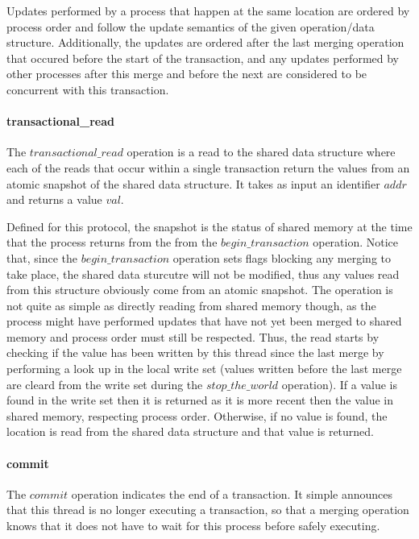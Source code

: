 \documentclass[11pt,letterpaper]{article}
\begin{document}
Updates performed by a process that happen at the same location are ordered by process order and
follow the update semantics of the given operation/data structure.
Additionally, the updates are ordered after the last merging operation that occured before
the start of the transaction, and any updates performed by other processes after this merge and before
the next are considered to be concurrent with this transaction.


\paragraph{transactional\_read}
The $\mathit{transactional\_read}$ operation is a read to the shared data structure
where each of the reads that occur within a single transaction return the values from
an atomic snapshot of the shared data structure.
It takes as input an identifier $\mathit{addr}$ and returns a value $\mathit{val}$.

Defined for this protocol, the snapshot is the status of shared memory at the time that
the process returns from the from the $\mathit{begin\_transaction}$ operation.
Notice that, since the $\mathit{begin\_transaction}$ operation
sets flags blocking any merging to take place, the shared data sturcutre
will not be modified, thus any values read from this structure obviously come from
an atomic snapshot.
The operation is not quite as simple as directly reading from shared memory though,
as the process might have performed updates that have not yet been merged to shared memory
and process order must still be respected.
Thus, the read starts by checking if the value has been written by this
thread since the last merge by performing a look up in the local write set
(values written before the last merge are cleard from the write set during
the $\mathit{stop\_the\_world}$ operation).
If a value is found in the write set then it is returned as it is more recent
then the value in shared memory, respecting process order.
Otherwise, if no value is found,
the location is read from the shared data structure and that value is returned.



\paragraph{commit}
The $\mathit{commit}$ operation indicates the end of a transaction.
It simple announces that this thread is no longer executing a transaction,
so that a merging operation knows that it does not have to wait for this process
before safely executing.
\end{document}
